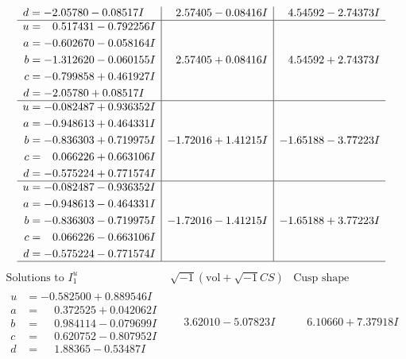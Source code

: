 \documentclass[1p]{elsarticle_modified}
\theoremstyle{definition}
\newcommand{\I}{\sqrt{-1}}
\begin{document}
$$\begin{array}{c|c|c}
\begin{aligned}
d &= -2.05780 - 0.08517 I\end{aligned}
 & \phantom{-}2.57405 - 0.08416 I & \phantom{-}4.54592 - 2.74373 I \\ \hline\begin{aligned}
u &= \phantom{-}0.517431 - 0.792256 I \\
a &= -0.602670 - 0.058164 I \\
b &= -1.312620 - 0.060155 I \\
c &= -0.799858 + 0.461927 I \\
d &= -2.05780 + 0.08517 I\end{aligned}
 & \phantom{-}2.57405 + 0.08416 I & \phantom{-}4.54592 + 2.74373 I \\ \hline\begin{aligned}
u &= -0.082487 + 0.936352 I \\
a &= -0.948613 + 0.464331 I \\
b &= -0.836303 + 0.719975 I \\
c &= \phantom{-}0.066226 + 0.663106 I \\
d &= -0.575224 + 0.771574 I\end{aligned}
 & -1.72016 + 1.41215 I & -1.65188 - 3.77223 I \\ \hline\begin{aligned}
u &= -0.082487 - 0.936352 I \\
a &= -0.948613 - 0.464331 I \\
b &= -0.836303 - 0.719975 I \\
c &= \phantom{-}0.066226 - 0.663106 I \\
d &= -0.575224 - 0.771574 I\end{aligned}
 & -1.72016 - 1.41215 I & -1.65188 + 3.77223 I\\
 \hline 
 \end{array}$$\newpage$$\begin{array}{c|c|c}  
\text{Solutions to }I^u_{1}& \I (\text{vol} + \sqrt{-1}CS) & \text{Cusp shape}\\
 \hline 
\begin{aligned}
u &= -0.582500 + 0.889546 I \\
a &= \phantom{-}0.372525 + 0.042062 I \\
b &= \phantom{-}0.984114 - 0.079699 I \\
c &= \phantom{-}0.620752 - 0.807952 I \\
d &= \phantom{-}1.88365 - 0.53487 I\end{aligned}
 & \phantom{-}3.62010 - 5.07823 I & \phantom{-}6.10660 + 7.37918 I \\ \hline\begin{aligned}

\end{aligned}
\end{array}$$
\end{document}
